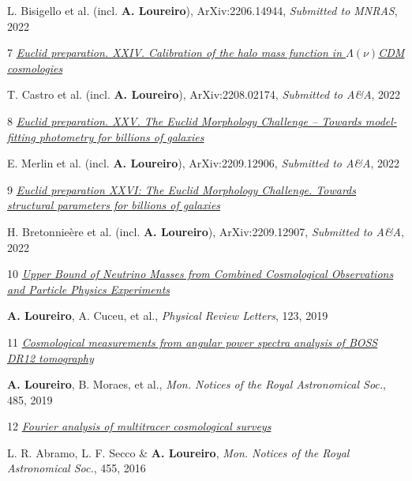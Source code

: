 \begin{cvitems}
\footnotesize{{L. Bisigello} et al. (incl. \textbf{A. Loureiro}), ArXiv:2206.14944, \textit{Submitted to MNRAS}, 2022 }
\item[7] \textit{\href{https://arxiv.org/abs/2208.02174}{\footnotesize{Euclid preparation. XXIV. Calibration of the halo mass function in $\Lambda(\nu)$CDM cosmologies}}  }

\footnotesize{{T. Castro} et al. (incl. \textbf{A. Loureiro}), ArXiv:2208.02174, \textit{Submitted to A\&A}, 2022 }
\item[8] \textit{\href{https://arxiv.org/abs/2209.12906}{\footnotesize{Euclid preparation. XXV. The Euclid Morphology Challenge -- Towards model-fitting photometry for billions of galaxies}}  }

\footnotesize{{E. Merlin} et al. (incl. \textbf{A. Loureiro}), ArXiv:2209.12906, \textit{Submitted to A\&A}, 2022 }
\item[9] \textit{\href{https://arxiv.org/abs/2209.12907}{\footnotesize{Euclid preparation XXVI: The Euclid Morphology Challenge. Towards structural parameters for billions of galaxies}}  }

\footnotesize{{H. Bretonnie\`ere} et al. (incl. \textbf{A. Loureiro}), ArXiv:2209.12907, \textit{Submitted to A\&A}, 2022 }
\item[10] \textit{\href{https://arxiv.org/abs/1811.02578}{\footnotesize{Upper Bound of Neutrino Masses from Combined Cosmological Observations and Particle Physics Experiments}}  }

\footnotesize{\textbf{A. Loureiro}, A. Cuceu, et al., \textit{Physical Review Letters}, 123, 2019}
\item[11] \textit{\href{https://arxiv.org/abs/1809.07204}{\footnotesize{Cosmological measurements from angular power spectra analysis of BOSS DR12 tomography}}}

\footnotesize{\textbf{A. Loureiro}, B. Moraes, et al., \textit{Mon. Notices of the Royal Astronomical Soc.}, 485, 2019}
\item[12] \textit{\href{https://arxiv.org/abs/1505.04106}{\footnotesize{Fourier analysis of multitracer cosmological surveys}}}

\footnotesize{L. R. Abramo, L. F. Secco \& \textbf{A. Loureiro}, \textit{Mon. Notices of the Royal Astronomical Soc.}, 455, 2016}


\end{cvitems}
